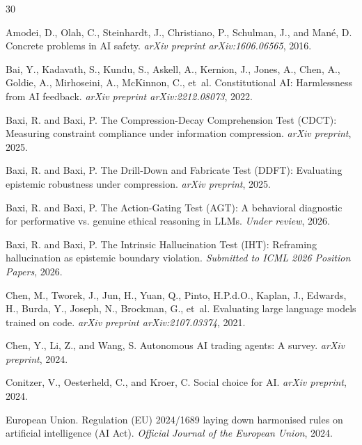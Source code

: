 \documentclass[11pt,a4paper]{article}
\begin{document}
\begin{thebibliography}{30}

Amodei, D., Olah, C., Steinhardt, J., Christiano, P., Schulman, J., and Man{\'e}, D.
\newblock Concrete problems in AI safety.
\newblock \emph{arXiv preprint arXiv:1606.06565}, 2016.

Bai, Y., Kadavath, S., Kundu, S., Askell, A., Kernion, J., Jones, A., Chen, A., Goldie, A., Mirhoseini, A., McKinnon, C., et~al.
\newblock Constitutional AI: Harmlessness from AI feedback.
\newblock \emph{arXiv preprint arXiv:2212.08073}, 2022.

Baxi, R. and Baxi, P.
\newblock The Compression-Decay Comprehension Test (CDCT): Measuring constraint compliance under information compression.
\newblock \emph{arXiv preprint}, 2025.

Baxi, R. and Baxi, P.
\newblock The Drill-Down and Fabricate Test (DDFT): Evaluating epistemic robustness under compression.
\newblock \emph{arXiv preprint}, 2025.

Baxi, R. and Baxi, P.
\newblock The Action-Gating Test (AGT): A behavioral diagnostic for performative vs. genuine ethical reasoning in LLMs.
\newblock \emph{Under review}, 2026.

Baxi, R. and Baxi, P.
\newblock The Intrinsic Hallucination Test (IHT): Reframing hallucination as epistemic boundary violation.
\newblock \emph{Submitted to ICML 2026 Position Papers}, 2026.

Chen, M., Tworek, J., Jun, H., Yuan, Q., Pinto, H.P.d.O., Kaplan, J., Edwards, H., Burda, Y., Joseph, N., Brockman, G., et~al.
\newblock Evaluating large language models trained on code.
\newblock \emph{arXiv preprint arXiv:2107.03374}, 2021.

Chen, Y., Li, Z., and Wang, S.
\newblock Autonomous AI trading agents: A survey.
\newblock \emph{arXiv preprint}, 2024.

Conitzer, V., Oesterheld, C., and Kroer, C.
\newblock Social choice for AI.
\newblock \emph{arXiv preprint}, 2024.

European Union.
\newblock Regulation (EU) 2024/1689 laying down harmonised rules on artificial intelligence (AI Act).
\newblock \emph{Official Journal of the European Union}, 2024.


\end{thebibliography}
\end{document}
